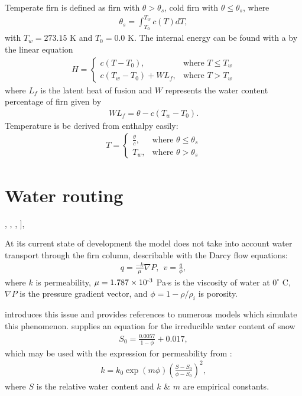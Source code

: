 Temperate firn is defined as firn with $\theta > \theta_s$, cold firn with $\theta \leq \theta_s$, where
\begin{align*}
  \theta_s = \int_{T_0}^{T_w}{c(T)}dT,
\end{align*}
with $T_w = 273.15$ K and $T_0 = 0.0$ K.  The internal energy can be found with a by the linear equation
\begin{align}
  H = 
  \begin{cases}
    c(T - T_0), &\text{where } T \leq T_w\\
    c(T_w - T_0) + W L_f,  &\text{where } T > T_w
  \end{cases}
\end{align}
where $L_f$ is the latent heat of fusion and $W$ represents the water content percentage of firn given by
\begin{align}
  W L_f = \theta - c(T_w - T_0).
\end{align}
Temperature is be derived from enthalpy easily:
\begin{align}
  T = 
  \begin{cases}
    \frac{\theta}{c}, &\text{where } \theta \leq \theta_s \\
    T_w,              &\text{where } \theta > \theta_s
  \end{cases}
\end{align}

\section{Water routing}

\citep{shimizu_1970}, \citet{coleou_1998}, \citet{wakahama_1968}, \citet{brun_1989}],

At its current state of development the model does not take into account water transport through the firn column, describable with the Darcy flow equations:
\begin{align*}
    q = \frac{-k}{\mu}\nabla P, \ \  v = \frac{q}{\phi},
\end{align*}
where $k$ is permeability, $\mu = 1.787 \times 10^{\textrm{-3}}$ Pa$\cdot$s is the viscosity of water at $0^{\circ}$ C, $\nabla P$ is the pressure gradient vector, and $\phi = 1- \rho/\rho_i$ is porosity.

\citet{waldner_2004} introduces this issue and provides references to numerous models which simulate this phenomenon.  \citet{coleou_1998} supplies an equation for the irreducible water content of snow
\begin{align*}
    S_0 = \frac{0.0057}{1 - \phi} + 0.017,
\end{align*}
which may be used with the expression for permeability from \citet{bozhinskiy_1989} :
\begin{align*}
    k = k_0 \exp(m \phi)\left( \frac{S - S_0}{\phi - S_0} \right)^2,
\end{align*}
where $S$ is the relative water content and $k$ \& $m$ are empirical constants.


